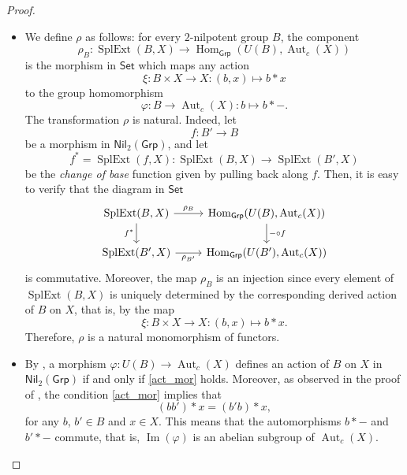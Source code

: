 \documentclass[reqno,hidelinks,a4paper]{amsart}
\theoremstyle{plain}
\theoremstyle{definition}
\theoremstyle{remark}
\numberwithin{equation}{section}
\DeclareMathOperator{\Aut}{Aut}
\DeclareMathOperator{\Hom}{Hom}
\DeclareMathOperator{\SplExt}{SplExt}
\DeclareMathOperator{\Imm}{Im}
\newcommand{\Grp}{\ensuremath{\mathsf{Grp}}}
\newcommand{\Set}{\ensuremath{\mathsf{Set}}}
\newcommand{\Nil}{\ensuremath{\mathsf{Nil}}}
\begin{document}
\begin{proof}{\ }
    \begin{itemize}
        \item[(i)] We define \(\rho\) as follows: for every \(2\)-nilpotent group \(B\), the component
              \[
                  \rho_B \colon \SplExt(B,X) \to \Hom_\Grp(U(B),\Aut_c(X))
              \]
              is the morphism in \(\Set\) which maps any action
              \[
                  \xi \colon B \times X \to X \colon (b,x) \mapsto b \ast x
              \]
              to the group homomorphism
              \[
                  \varphi \colon B \to \Aut_c(X) \colon b \mapsto b \ast -.
              \]
              The transformation \(\rho\) is natural. Indeed, let
              \[
                  f \colon B' \to B
              \]
              be a morphism in \(\Nil_2(\Grp)\), and let
              \[
                  f^*=\SplExt(f,X) \colon \SplExt(B,X) \to \SplExt(B',X)
              \]
              be the \emph{change of base} function given by pulling back along \(f\). Then, it is easy to verify that the diagram in \(\Set\)
              \[
                  \begin{tikzcd}
                      \SplExt(B,X) \arrow[r, "\rho_B"] \arrow[d, swap, "{f^\ast}"]
                      & \Hom_\Grp(U(B),\Aut_c(X)) \arrow[d,"{- \circ f}"]\\
                      \SplExt(B',X) \arrow[r, swap, "\rho_{B'}"] & \Hom_\Grp(U(B'),\Aut_c(X))
                  \end{tikzcd}
              \]
              is commutative. Moreover, the map \(\rho_B\) is an injection since every element of \(\SplExt(B,X)\) is uniquely determined by the corresponding derived action of \(B\) on \(X\), that is, by the map
              \[
                  \xi \colon B \times X \to X \colon (b,x) \mapsto b \ast x.
              \]
              Therefore, \(\rho\) is a natural monomorphism of functors.
        \item[(ii)] By , a morphism \(\varphi \colon U(B) \to \Aut_c(X)\) defines an action of \(B\) on \(X\) in \(\Nil_2(\Grp)\) if and only if \eqref{act_mor} holds. Moreover, as observed in the proof of , the condition \eqref{act_mor} implies that
              \[
                  (bb') \ast x = (b'b) \ast x,
              \]
              for any \(b\), \(b' \in B\) and \(x \in X\). This means that the automorphisms \(b \ast -\) and \(b' \ast -\) commute, that is, \(\Imm(\varphi)\) is an abelian subgroup of \(\Aut_c(X)\).\qedhere
    \end{itemize}
\end{proof}
\end{document}
